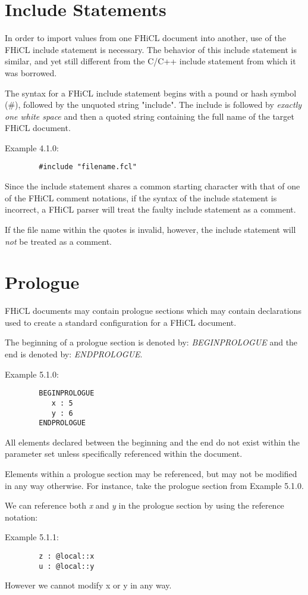 \documentclass{article}
\begin{document}
\section{Include Statements}
	In order to import values from one FHiCL document into another,
	use of the FHiCL include statement is necessary.
	The behavior of this include statement is similar,
	and yet still different from the C/C++ include statement from which it was borrowed.
	\par
	The syntax for a FHiCL include statement begins with a pound or hash symbol (\#),
	followed by the unquoted string "include".
	The include is followed by \emph{exactly one white space}
	and then a quoted string containing the full name of the target FHiCL document.
	\par
	Example 4.1.0:
	\begin{verbatim}
		#include "filename.fcl"
	\end{verbatim}	
	\par
	Since the include statement shares a common starting character with that of one of the FHiCL comment notations,
	if the syntax of the include statement is incorrect,
	a FHiCL parser will treat the faulty include statement as a comment.
	\par
	If the file name within the quotes is invalid, however, the include statement will \emph{not} be treated as a comment.
\section{Prologue}
	FHiCL documents may contain prologue sections which may contain declarations used to create
	a standard configuration for a FHiCL document.
	\par
	The beginning of a prologue section is denoted by:
	\emph{BEGINPROLOGUE}
	and the end is denoted by:
	\emph{ENDPROLOGUE}.
	\par
	Example 5.1.0:
	\begin{verbatim}
		BEGINPROLOGUE
		   x : 5
		   y : 6
		ENDPROLOGUE
	\end{verbatim}
	All elements declared between the beginning and the end 
	do not exist within the parameter set unless specifically
	referenced within the document.
	\par
	Elements within a prologue section may be referenced,
	but may not be modified in any way otherwise.
	For instance, take the prologue section from Example 5.1.0.
	\par
	We can reference both \emph{x} and \emph{y} in the prologue section by using the reference notation:
	\par
	Example 5.1.1:
	\begin{verbatim}
		z : @local::x
		u : @local::y
	\end{verbatim}
	\par
	However we cannot modify x or y in any way.
\end{document}
